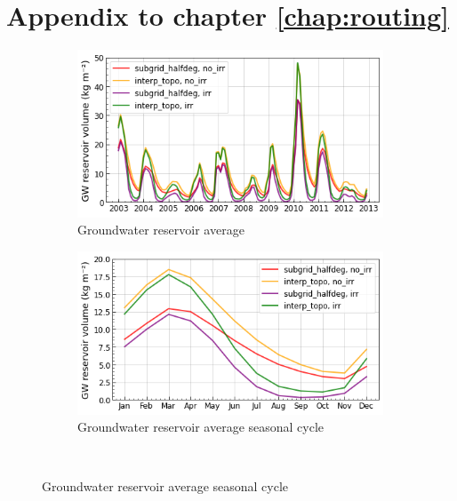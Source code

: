 \section*{Appendix to chapter \ref{chap:routing}}

\begin{figure}[htbp]
    \centering
    \begin{subfigure}[b]{0.48\textwidth}
        \caption{Groundwater reservoir average}
        \includegraphics[width=\textwidth]{images/chap3/time_series/slowr_time_series.png}
    \end{subfigure}
        \begin{subfigure}[b]{0.48\textwidth}
        \caption{Groundwater reservoir average seasonal cycle}
        \includegraphics[width=\textwidth]{images/chap3/time_series/slowr_seasonal_cycle.png}
    \end{subfigure} \\
    

\end{figure}
